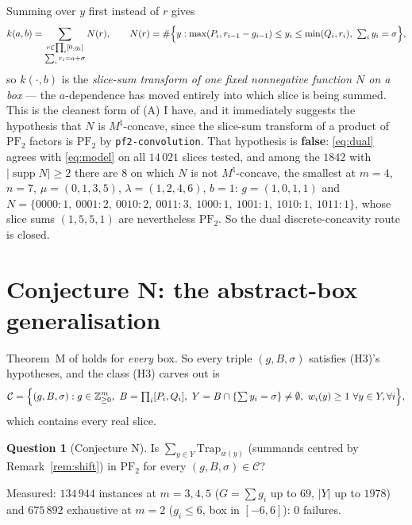 \documentclass[11pt]{article}
\theoremstyle{plain}
\theoremstyle{definition}
\newtheorem{question}[theorem]{Question}
\DeclareMathOperator{\supp}{supp}
\newcommand{\PFtwo}{\mathrm{PF}_2}
\newcommand{\Trap}{\mathrm{Trap}}
\newcommand{\Z}{\mathbb{Z}}
\begin{document}
Summing over $y$ first instead of $r$ gives
\begin{equation}\label{eq:dual}
  k(a,b)=\sum_{\substack{r\in\prod_i[0,g_i]\\ \sum_ir_i=a+\sigma}} N(r),
  \qquad
  N(r)=\#\Bigl\{y:\max(P_i,r_{i-1}-g_{i-1})\le y_i\le\min(Q_i,r_i),\ \textstyle\sum_iy_i=\sigma\Bigr\},
\end{equation}
so $k(\cdot,b)$ is the \emph{slice-sum transform of one fixed nonnegative function $N$
on a box} --- the $a$-dependence has moved entirely into which slice is being summed.
This is the cleanest form of (A) I have, and it immediately suggests the hypothesis that
$N$ is $M^\natural$-concave, since the slice-sum transform of a product of $\PFtwo$
factors is $\PFtwo$ by \texttt{pf2-convolution}. That hypothesis is \textbf{false}:
\eqref{eq:dual} agrees with \eqref{eq:model} on all $14\,021$ slices tested, and among the
$1842$ with $|{\supp N}|\ge2$ there are $8$ on which $N$ is not $M^\natural$-concave, the
smallest at $m=4$, $n=7$, $\mu=(0,1,3,5)$, $\lambda=(1,2,4,6)$, $b=1$:
$g=(1,0,1,1)$ and
$N=\{0000{:}1,\ 0001{:}2,\ 0010{:}2,\ 0011{:}3,\ 1000{:}1,\ 1001{:}1,\ 1010{:}1,\ 1011{:}1\}$,
whose slice sums $(1,5,5,1)$ are nevertheless $\PFtwo$. So the dual discrete-concavity
route is closed.

\section{Conjecture N: the abstract-box generalisation}\label{sec:N}

Theorem~M of \cite{c1004} holds for \emph{every} box. So every triple $(g,B,\sigma)$
satisfies (H3)'s hypotheses, and the class (H3) carves out is
\[
  \mathcal C=\Bigl\{(g,B,\sigma):g\in\Z_{\ge0}^m,\ B=\textstyle\prod_i[P_i,Q_i],\
  Y=B\cap\{\textstyle\sum y_i=\sigma\}\ne\emptyset,\ w_i(y)\ge1\ \forall y\in Y,\forall i\Bigr\},
\]
which contains every real slice.

\begin{question}[Conjecture N]\label{conj:N}
Is $\sum_{y\in Y}\Trap_{w(y)}$ (summands centred by Remark~\ref{rem:shift}) in $\PFtwo$
for every $(g,B,\sigma)\in\mathcal C$?
\end{question}

Measured: $134\,944$ instances at $m=3,4,5$ ($G=\sum g_i$ up to $69$, $|Y|$ up to $1978$)
and $675\,892$ exhaustive at $m=2$ ($g_i\le6$, box in $[-6,6]$): $0$ failures.
\end{document}

